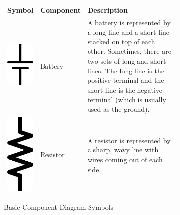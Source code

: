 \begin{figure}
\caption{Basic Component Diagram Symbols}
\label{figBasicDiagramSymbols}
\begin{center}
\begin{tabular}{M{0.1\linewidth} | M{0.12\linewidth} | m{0.6\linewidth}}
\textbf{Symbol} & \textbf{Component} & \textbf{Description} \\
\includegraphics[scale=0.125]{BatterySymbol.png} & Battery & A battery is represented by a long line and a short line stacked on top of each other.  Sometimes, there are two sets of long and short lines.  The long line is the positive terminal and the short line is the negative terminal (which is usually used as the ground). \\ \hline
\includegraphics[scale=0.125]{ResistorSymbol.png} & Resistor & A resistor is represented by a sharp, wavy line with wires coming out of each side. \\ \hline

\end{tabular}
\end{center}
\end{figure}

